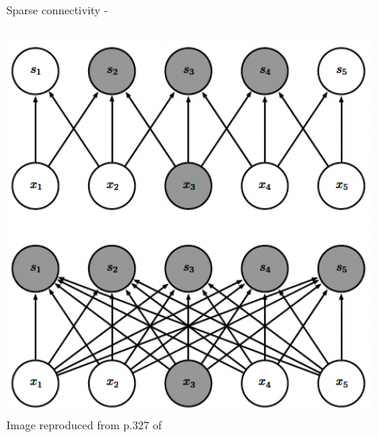 \begin{frame}[t,allowframebreaks]{Sparse connectivity -}
    \framebreak

    \begin{columns}
        \begin{column}{0.50\textwidth}
         \begin{center}
          \includegraphics[width=1.0\textwidth]
          {./images/cnn/sparse_connectivity/goodfellow17_sparse_connectivity_from_below_01.png}\\
          {\scriptsize \color{col:attribution} 
          Image reproduced from p.327 of \cite{Goodfellow:2017MITDL}}\\
         \end{center}
        \end{column}
        \begin{column}{0.50\textwidth}
        \end{column}
    \end{columns}

\end{frame}
